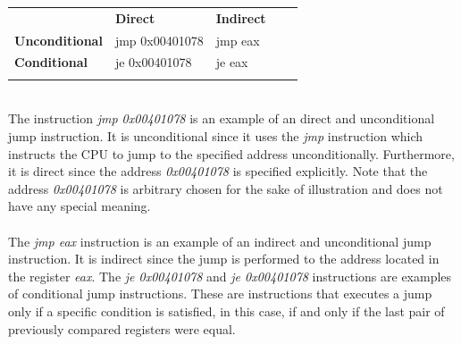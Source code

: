 \documentclass{kththesis}
\begin{document}
\begin{table}[ht]
\centering
\begin{tabular}{lllll}
\cline{1-3}
\multicolumn{1}{|l|}{\textbf{}}              & \multicolumn{1}{l|}{\textbf{Direct}} & \multicolumn{1}{l|}{\textbf{Indirect}} &  &  \\ \cline{1-3}
\multicolumn{1}{|l|}{\textbf{Unconditional}} & \multicolumn{1}{l|}{jmp 0x00401078}    & \multicolumn{1}{l|}{jmp eax}           &  &  \\ \cline{1-3}
\multicolumn{1}{|l|}{\textbf{Conditional}}   & \multicolumn{1}{l|}{je 0x00401078}     & \multicolumn{1}{l|}{je eax}            &  &  \\ \cline{1-3}
                                             &                                      &                                        &  &
\end{tabular}
\label{tab:jumps}
\end{table}
\noindent
\\
The instruction \textit{jmp 0x00401078} is an example of an direct and unconditional jump instruction. It is unconditional since it uses the \textit{jmp} instruction which instructs the CPU to jump to the specified address unconditionally. Furthermore, it is direct since the address \textit{0x00401078} is specified explicitly. Note that the address \textit{0x00401078} is arbitrary chosen for the sake of illustration and does not have any special meaning.
\\ \\
The \textit{jmp eax} instruction is an example of an indirect and unconditional jump instruction. It is indirect since the jump is performed to the address located in the register \textit{eax}. The \textit{je 0x00401078} and \textit{je 0x00401078} instructions are examples of conditional jump instructions. These are instructions that executes a jump only if a specific condition is satisfied, in this case, if and only if the last pair of previously compared registers were equal. 
\\ \\
\end{document}

